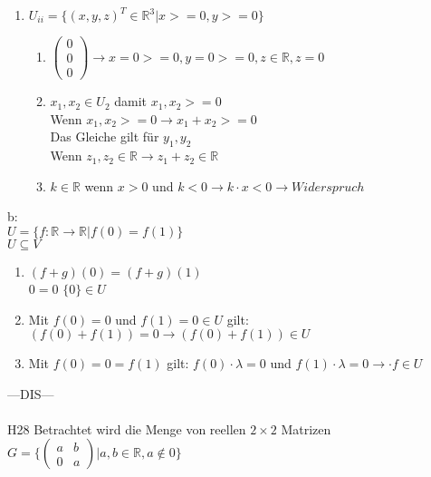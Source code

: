 \documentclass{scrartcl}
\begin{document}
\begin{enumerate}
	\item
	$U_{ii} = \{ (x,y,z)^T \in \mathbb{R}^3 \vert x >= 0, y>=0 \}$
	\begin{enumerate}
		\item
		$\begin{pmatrix}
			0 \\ 0 \\ 0
		\end{pmatrix} \rightarrow x=0>=0, y=0 >= 0, z \in \mathbb{R}, z = 0$
		\item
		$x_1, x_2 \in U_2$ damit $x_1,x_2 >= 0$\\
		Wenn $x_1, x_2 >= 0 \rightarrow x_1 + x_2 >=0$\\
		Das Gleiche gilt für $y_1,y_2$\\
		Wenn $z_1, z_2 \in \mathbb{R} \rightarrow z_1 +z_2 \in \mathbb{R}$
		\item
		$k \in \mathbb{R}$ wenn $x > 0$ und $k < 0 \rightarrow k \cdot x < 0 \rightarrow Widerspruch$
	\end{enumerate}
\end{enumerate}	
b:\\
$U = \{ f: \mathbb{R} \rightarrow \mathbb{R} \vert f(0) = f(1) \}$\\
$U \subseteq V$\begin{enumerate}
	\item
	$(f+g)(0)=(f+g)(1)$\\
	$0 = 0$ \hspace{2cm} $\{0\} \in U$
	\item
	Mit $f(0)=0$ und $f(1)=0 \in U$ gilt:\\
	$(f(0)+f(1)) = 0 \rightarrow (f(0) + f(1)) \in U$
	\item
	Mit $f(0) = 0 = f(1)$ gilt: $f(0) \cdot \lambda = 0$ und $f(1) \cdot \lambda = 0 \rightarrow \cdot f \in U$
\end{enumerate}
\newpage
---DIS---\\\\
H28 Betrachtet wird die Menge von reellen $2 \times 2$ Matrizen\\
$G = \{ \begin{pmatrix}
	a & b \\ 0 & a
\end{pmatrix} \vert a,b \in \mathbb{R}, a \not \in 0 \}$\\
\end{document}
